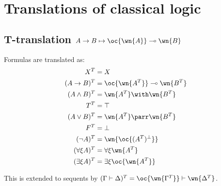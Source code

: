\allowdisplaybreaks

\chapter{Translations of classical logic}\label{translations-of-classical-logic}

\section{\texorpdfstring{T-translation \(A\imp B \mapsto \oc{\wn{A}}\limp\wn{B}\)}{T-translation A\textbackslash{}imp B \textbackslash{}mapsto \textbackslash{}oc\{\textbackslash{}wn\{A\}\}\textbackslash{}limp\textbackslash{}wn\{B\}}}\label{t-translation-aimp-b-mapsto-ocwnalimpwnb}

Formulas are translated as:
\begin{align*}
X^T & = X \\
(A\imp B)^T & = \oc{\wn{A^T}}\limp\wn{B^T} \\
(A\wedge B)^T & = \wn{A^T} \with \wn{B^T} \\
T^T & = \top \\
(A\vee B)^T & = \wn{A^T}\parr\wn{B^T} \\
F^T & = \bot \\
(\neg A)^T & = \wn{\oc{(A^T)\orth}} \\
(\forall\xi A)^T & = \forall\xi \wn{A^T} \\
(\exists\xi A)^T & = \exists\xi \oc{\wn{A^T}}
\end{align*}

This is extended to sequents by
\((\Gamma\vdash\Delta)^T = \oc{\wn{\Gamma^T}}\vdash\wn{\Delta^T}\).

